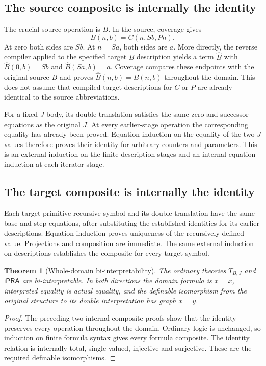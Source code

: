 \documentclass[11pt]{article}
\newtheorem{theorem}{Theorem}[section]
\theoremstyle{definition}
\newcommand{\ipra}{\mathsf{iPRA}}
\newcommand{\TB}{T_{B,J}}
\begin{document}
\subsection{The source composite is internally the identity}

The crucial source operation is $B$. In the source, coverage gives
\begin{equation}
 B(n,b)=C(n,Sb,Pn).
 \label{eq:Bcharacterization}
\end{equation}
At zero both sides are $Sb$. At $n=Sa$, both sides are $a$.
More directly, the reverse compiler applied to the specified target
$B$ description yields a term $\widehat B$ with
$\widehat B(0,b)=Sb$ and $\widehat B(Sa,b)=a$. Coverage compares
these endpoints with the original source $B$ and proves
$\widehat B(n,b)=B(n,b)$ throughout the domain. This does not assume
that compiled target descriptions for $C$ or $P$ are already identical
to the source abbreviations.

For a fixed $J$ body, its double translation satisfies the same zero
and successor equations as the original $J$. At every earlier-stage
operation the corresponding equality has already been proved. Equation
induction on the equality of the two $J$ values therefore proves their
identity for arbitrary counters and parameters. This is an external
induction on the finite description stages and an internal equation
induction at each iterator stage.

\subsection{The target composite is internally the identity}

Each target primitive-recursive symbol and its double translation have
the same base and step equations, after substituting the established
identities for its earlier descriptions. Equation induction proves
uniqueness of the recursively defined value. Projections and composition
are immediate. The same external induction on descriptions establishes
the composite for every target symbol.

\begin{theorem}[Whole-domain bi-interpretability]
\label{thm:ordinary-bii}
The ordinary theories $\TB$ and $\ipra$ are bi-interpretable.
In both directions the domain formula is $x=x$, interpreted equality
is actual equality, and the definable isomorphism from the original
structure to its double interpretation has graph $x=y$.
\end{theorem}
\begin{proof}
The preceding two internal composite proofs show that the identity
preserves every operation throughout the domain. Ordinary logic is
unchanged, so induction on finite formula syntax gives every formula
composite. The identity relation is internally total, single valued, injective and surjective. These are the required definable isomorphisms.
\end{proof}
\end{document}
